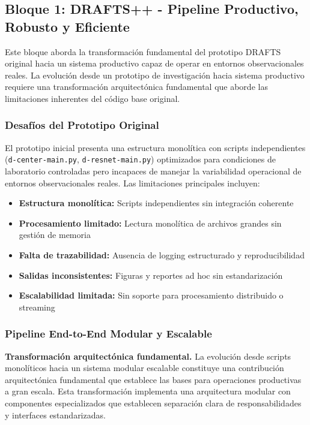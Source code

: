 \subsection{Bloque 1: DRAFTS++ - Pipeline Productivo, Robusto y Eficiente}

Este bloque aborda la transformación fundamental del prototipo DRAFTS original hacia un sistema productivo capaz de operar en entornos observacionales reales. La evolución desde un prototipo de investigación hacia sistema productivo requiere una transformación arquitectónica fundamental que aborde las limitaciones inherentes del código base original.

\subsubsection{Desafíos del Prototipo Original}

El prototipo inicial presenta una estructura monolítica con scripts independientes (\texttt{d-center-main.py}, \texttt{d-resnet-main.py}) optimizados para condiciones de laboratorio controladas pero incapaces de manejar la variabilidad operacional de entornos observacionales reales. Las limitaciones principales incluyen:

\begin{itemize}
\item \textbf{Estructura monolítica:} Scripts independientes sin integración coherente
\item \textbf{Procesamiento limitado:} Lectura monolítica de archivos grandes sin gestión de memoria
\item \textbf{Falta de trazabilidad:} Ausencia de logging estructurado y reproducibilidad
\item \textbf{Salidas inconsistentes:} Figuras y reportes ad hoc sin estandarización
\item \textbf{Escalabilidad limitada:} Sin soporte para procesamiento distribuido o streaming
\end{itemize}

\subsubsection{Pipeline End-to-End Modular y Escalable}

\noindent\textbf{Transformación arquitectónica fundamental.} La evolución desde scripts monolíticos hacia un sistema modular escalable constituye una contribución arquitectónica fundamental que establece las bases para operaciones productivas a gran escala. Esta transformación implementa una arquitectura modular con componentes especializados que establecen separación clara de responsabilidades y interfaces estandarizadas.


